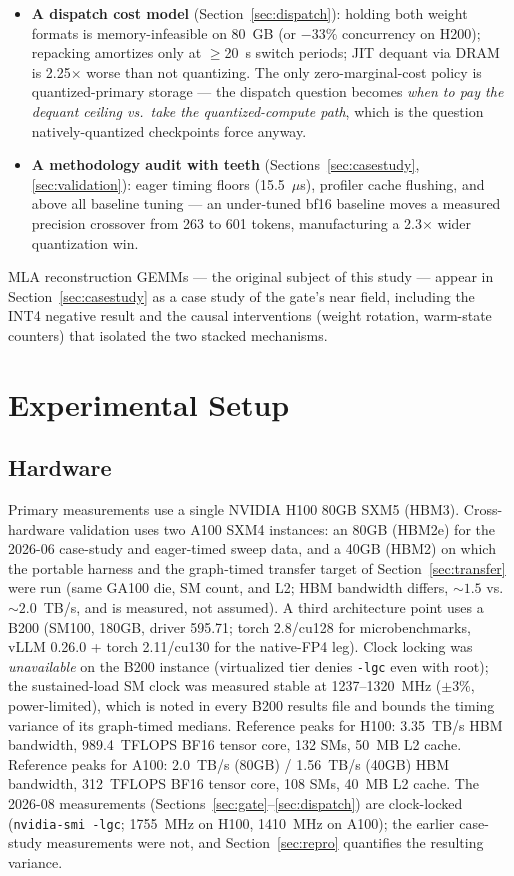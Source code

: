 \documentclass[10pt,twocolumn]{article}
\begin{document}
\begin{itemize}[leftmargin=*,topsep=0pt]
  \item \textbf{A dispatch cost model} (Section~\ref{sec:dispatch}): holding both weight formats is memory-infeasible on 80~GB (or $-33\%$ concurrency on H200); repacking amortizes only at $\geq$20~s switch periods; JIT dequant via DRAM is 2.25$\times$ worse than not quantizing.  The only zero-marginal-cost policy is quantized-primary storage --- the dispatch question becomes \emph{when to pay the dequant ceiling vs.\ take the quantized-compute path}, which is the question natively-quantized checkpoints force anyway.
  \item \textbf{A methodology audit with teeth} (Sections~\ref{sec:casestudy}, \ref{sec:validation}): eager timing floors (15.5~$\mu$s), profiler cache flushing, and above all baseline tuning --- an under-tuned bf16 baseline moves a measured precision crossover from 263 to 601 tokens, manufacturing a 2.3$\times$ wider quantization win.
\end{itemize}

MLA reconstruction GEMMs --- the original subject of this study --- appear in Section~\ref{sec:casestudy} as a case study of the gate's near field, including the INT4 negative result and the causal interventions (weight rotation, warm-state counters) that isolated the two stacked mechanisms.

\section{Experimental Setup}

\subsection{Hardware}
Primary measurements use a single NVIDIA H100 80GB SXM5 (HBM3).  Cross-hardware validation uses two A100 SXM4 instances: an 80GB (HBM2e) for the 2026-06 case-study and eager-timed sweep data, and a 40GB (HBM2) on which the portable harness and the graph-timed transfer target of Section~\ref{sec:transfer} were run (same GA100 die, SM count, and L2; HBM bandwidth differs, ${\sim}1.5$ vs.\ ${\sim}2.0$~TB/s, and is measured, not assumed).  A third architecture point uses a B200 (SM100, 180GB, driver 595.71; torch 2.8/cu128 for microbenchmarks, vLLM 0.26.0 + torch 2.11/cu130 for the native-FP4 leg).  Clock locking was \emph{unavailable} on the B200 instance (virtualized tier denies \texttt{-lgc} even with root); the sustained-load SM clock was measured stable at 1237--1320~MHz ($\pm$3\%, power-limited), which is noted in every B200 results file and bounds the timing variance of its graph-timed medians.  Reference peaks for H100: 3.35~TB/s HBM bandwidth, 989.4~TFLOPS BF16 tensor core, 132 SMs, 50~MB L2 cache.  Reference peaks for A100: 2.0~TB/s (80GB) / 1.56~TB/s (40GB) HBM bandwidth, 312~TFLOPS BF16 tensor core, 108 SMs, 40~MB L2 cache.  The 2026-08 measurements (Sections~\ref{sec:gate}--\ref{sec:dispatch}) are clock-locked (\texttt{nvidia-smi -lgc}; 1755~MHz on H100, 1410~MHz on A100); the earlier case-study measurements were not, and Section~\ref{sec:repro} quantifies the resulting variance.
\end{document}
